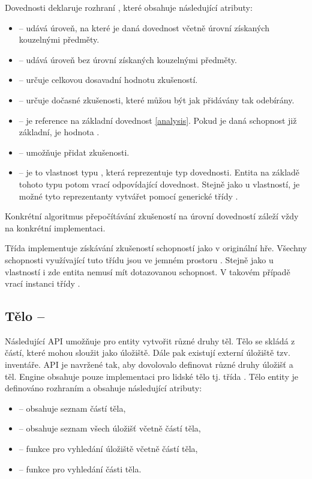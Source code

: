 Dovednosti deklaruje rozhraní , které obsahuje následující atributy:
\begin{itemize}
\item {} -- udává úroveň, na které je daná dovednost včetně úrovní získaných kouzelnými předměty.
\item {} -- udává úroveň bez úrovní získaných kouzelnými předměty.
\item {}  -- určuje celkovou dosavadní hodnotu zkušeností.
\item {} -- určuje dočasné zkušenosti, které můžou být jak přidávány tak odebírány.
\item {} -- je reference na základní dovednost \vref{analysis}. Pokud je daná schopnost 
	již základní, je hodnota .
\item {} --  umožňuje přidat zkušenosti.
\item {} -- je to vlastnost typu , která reprezentuje typ dovednosti.  Entita na základě 
	tohoto typu potom vrací odpovídající dovednost. Stejně jako u vlastností, je možné tyto reprezentanty vytvářet pomocí generické třídy . 
\end{itemize}

Konkrétní algoritmus přepočítávání zkušeností na úrovní dovedností záleží vždy na konkrétní implementaci.  

Třída  implementuje získávání zkušeností schopností jako v originální hře. Všechny schopnosti 
využívající tuto třídu jsou ve jemném prostoru . Stejně jako
u vlastností i zde entita nemusí mít dotazovanou schopnost. V takovém případě vrací instanci třídy .

\subsection{Tělo -- }

Následující API umožňuje pro entity vytvořit různé druhy těl.
Tělo se skládá z částí, které mohou sloužit jako úložiště. Dále pak existují externí
úložiště tzv. inventáře. API je navržené tak, aby dovolovalo definovat různé druhy úložišť a těl. 
Engine obsahuje pouze implementaci pro lidské tělo tj. třída .
Tělo entity je definováno rozhraním  a obsahuje následující atributy:

\begin{itemize}
\item {} -- obsahuje seznam částí těla,
\item {} -- obsahuje seznam všech úložišť včetně částí těla,
\item {} -- funkce pro vyhledání úložiště včetně částí těla,
\item {} -- funkce pro vyhledání části těla. 
\end{itemize}

